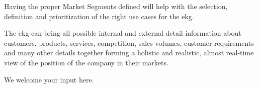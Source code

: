 %
%
\ekgmmHowEKGRequiresThisCapability

Having the proper Market Segments defined will help with the selection, definition and prioritization of
the right use cases for the \gls{ekg}.

\ekgmmHowEKGAffectsThisCapability

The \gls{ekg} can bring all possible internal and external detail information about customers, products, services,
competition, sales volumes, customer requirements and many other details together forming a holistic and realistic,
almost real-time view of the position of the company in their markets.

We welcome your input here.
